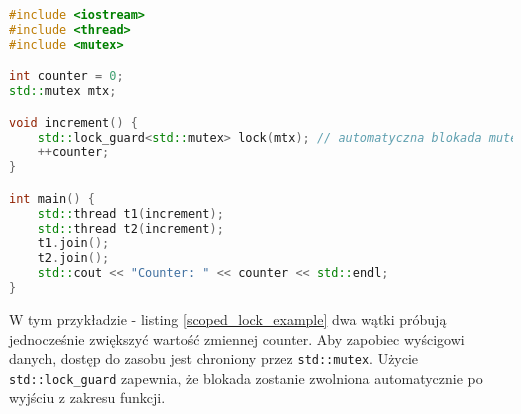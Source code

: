 \begin{lstlisting}[language=C++, style=VS2017,  caption={Przykład użycia std::scoped\_lock}, label={scoped_lock_example}]
#include <iostream>
#include <thread>
#include <mutex>

int counter = 0;
std::mutex mtx;

void increment() {
    std::lock_guard<std::mutex> lock(mtx); // automatyczna blokada mutexu
    ++counter;
}

int main() {
    std::thread t1(increment);
    std::thread t2(increment);
    t1.join();
    t2.join();
    std::cout << "Counter: " << counter << std::endl;
}
\end{lstlisting}
W tym przykładzie - listing \ref{scoped_lock_example} dwa wątki próbują jednocześnie zwiększyć wartość zmiennej counter. Aby zapobiec wyścigowi danych, dostęp do zasobu jest chroniony przez \texttt{std::mutex}. Użycie \texttt{std::lock\_guard} zapewnia, że blokada zostanie zwolniona automatycznie po wyjściu z zakresu funkcji.

